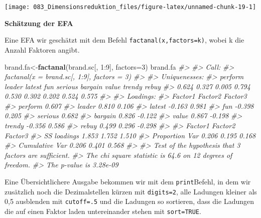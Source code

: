 \documentclass[12pt,]{book}
\makeatletter
\newenvironment{Shaded}{\begin{snugshade}}{\end{snugshade}}
\newcommand{\KeywordTok}[1]{\textcolor[rgb]{0.13,0.29,0.53}{\textbf{{#1}}}}
\newcommand{\DataTypeTok}[1]{\textcolor[rgb]{0.13,0.29,0.53}{{#1}}}
\newcommand{\DecValTok}[1]{\textcolor[rgb]{0.00,0.00,0.81}{{#1}}}
\newcommand{\CommentTok}[1]{\textcolor[rgb]{0.56,0.35,0.01}{\textit{{#1}}}}
\newcommand{\NormalTok}[1]{{#1}}
\newenvironment{kframe}{%
\medskip{}
\setlength{\fboxsep}{.8em}
 \def\at@end@of@kframe{}%
 \ifinner\ifhmode%
  \def\at@end@of@kframe{\end{minipage}}%
  \begin{minipage}{\columnwidth}%
 \fi\fi%
 \def\FrameCommand##1{\hskip\@totalleftmargin \hskip-\fboxsep
 \colorbox{shadecolor}{##1}\hskip-\fboxsep
     \hskip-\linewidth \hskip-\@totalleftmargin \hskip\columnwidth}%
 \MakeFramed {\advance\hsize-\width
   \@totalleftmargin\z@ \linewidth\hsize
   \@setminipage}}%
 {\par\unskip\endMakeFramed%
 \at@end@of@kframe}
\renewenvironment{Shaded}{\begin{kframe}}{\end{kframe}}
\makeatother
\begin{document}
\begin{center}\texttt{[image: 083\_Dimensionsreduktion\_files/figure-latex/unnamed-chunk-19-1]} \end{center}

\textbf{Schätzung der EFA}

Eine EFA wir geschätzt mit dem Befehl \texttt{factanal(x,factors=k)},
wobei k die Anzahl Faktoren angibt.

\begin{Shaded}
\begin{Highlighting}[]
\NormalTok{brand.fa<-}\KeywordTok{factanal}\NormalTok{(brand.sc[, }\DecValTok{1}\NormalTok{:}\DecValTok{9}\NormalTok{], }\DataTypeTok{factors=}\DecValTok{3}\NormalTok{)}
\NormalTok{brand.fa}
\CommentTok{#> }
\CommentTok{#> Call:}
\CommentTok{#> factanal(x = brand.sc[, 1:9], factors = 3)}
\CommentTok{#> }
\CommentTok{#> Uniquenesses:}
\CommentTok{#> perform  leader  latest     fun serious bargain   value  trendy   rebuy }
\CommentTok{#>   0.624   0.327   0.005   0.794   0.530   0.302   0.202   0.524   0.575 }
\CommentTok{#> }
\CommentTok{#> Loadings:}
\CommentTok{#>         Factor1 Factor2 Factor3}
\CommentTok{#> perform          0.607         }
\CommentTok{#> leader           0.810   0.106 }
\CommentTok{#> latest  -0.163           0.981 }
\CommentTok{#> fun             -0.398   0.205 }
\CommentTok{#> serious          0.682         }
\CommentTok{#> bargain  0.826          -0.122 }
\CommentTok{#> value    0.867          -0.198 }
\CommentTok{#> trendy  -0.356           0.586 }
\CommentTok{#> rebuy    0.499   0.296  -0.298 }
\CommentTok{#> }
\CommentTok{#>                Factor1 Factor2 Factor3}
\CommentTok{#> SS loadings      1.853   1.752   1.510}
\CommentTok{#> Proportion Var   0.206   0.195   0.168}
\CommentTok{#> Cumulative Var   0.206   0.401   0.568}
\CommentTok{#> }
\CommentTok{#> Test of the hypothesis that 3 factors are sufficient.}
\CommentTok{#> The chi square statistic is 64.6 on 12 degrees of freedom.}
\CommentTok{#> The p-value is 3.28e-09}
\end{Highlighting}
\end{Shaded}

Eine Übersichtlichere Ausgabe bekommen wir mit dem \texttt{print}Befehl,
in dem wir zusätzlich noch die Dezimalstellen kürzen mit
\texttt{digits=2}, alle Ladungen kleiner als 0,5 ausblenden mit
\texttt{cutoff=.5} und die Ladungen so sortieren, dass die Ladungen die
auf einen Faktor laden untereinander stehen mit \texttt{sort=TRUE}.
\end{document}
